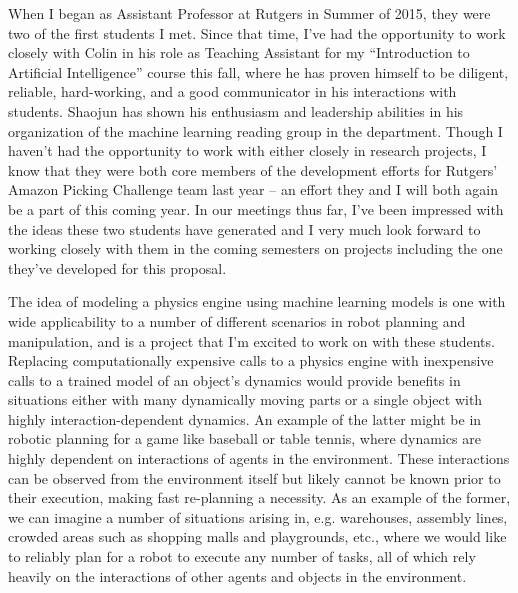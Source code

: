 \documentclass{letter} %
\begin{document}
\begin{letter}{}
When I began as Assistant Professor at Rutgers in Summer of 2015, they were two of the first students I met.
Since that time, I've had the opportunity to work closely with Colin in his role as Teaching Assistant
for my ``Introduction to Artificial Intelligence'' course this fall, where he has proven himself to be
diligent, reliable, hard-working, and a good communicator in his interactions with students. 
Shaojun has shown his enthusiasm and leadership abilities in his organization of the machine 
learning reading group in the department. Though I haven't had the opportunity to work with either
closely in research projects, I know that they were both core members of the development efforts
for Rutgers' Amazon Picking Challenge team last year -- an effort they and I will both again be
a part of this coming year. In our meetings thus far, I've been impressed with the ideas these two
students have generated and I very much look forward to working closely with them in the coming semesters
on projects including the one they've developed for this proposal.


The idea of modeling a physics engine using machine learning models is one with wide applicability
to a number of different scenarios in robot planning and manipulation, and is a project that I'm excited
to work on with these students. Replacing computationally expensive calls to a 
physics engine with inexpensive calls to a trained model of an object's dynamics would provide benefits
in situations either with many dynamically moving parts or a single object with highly interaction-dependent 
dynamics. An example of the latter might be in robotic planning for a game like baseball or table tennis, 
where dynamics are highly dependent on interactions of agents in the environment. These interactions can
be observed from the environment itself but likely cannot be known prior to their execution, making fast
re-planning a necessity. As an example of the former,
we can imagine a number of situations arising in, e.g. warehouses, assembly lines, crowded areas such as
shopping malls and playgrounds, etc., where we would like to reliably plan for a robot to execute any number
of tasks, all of which rely heavily on the interactions of other agents and objects in the environment.




\end{letter}
\end{document}
